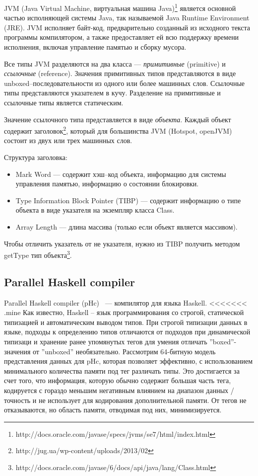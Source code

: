 JVM (Java Virtual Machine, виртуальная машина Java)\footnote{http://docs.oracle.com/javase/specs/jvms/se7/html/index.html}
является основной частью исполняющей системы Java, так называемой Java Runtime Environment (JRE).
JVM исполняет байт-код, предварительно созданный из исходного текста программы компилятором, а также
предоставляет ей всю поддержку времени исполнения, включая управление памятью и сборку мусора.

Все типы JVM разделяются на два класса --- \emph{примитивные} (primitive) и \emph{ссылочные} (reference).
Значения примитивных типов представляются в виде unboxed--последовательности из одного или более машинных слов.
Ссылочные типы представляются указателем в кучу. Разделение на примитивные и ссылочные типы является статическим.

Значение ссылочного типа представляется в виде \emph{объекта}.
Каждый объект содержит заголовок\footnote{http://jug.ua/wp-content/uploads/2013/02}, который для 
большинства JVM (Hotspot, openJVM) состоит из двух или трех машинных слов.

Структура заголовка:

\begin{itemize}
\item Mark Word --- содержит хэш--код объекта, информацию для системы управления памятью, информацию о состоянии блокировки. 
\item Type Information Block Pointer (TIBP) --- содержит информацию о типе объекта в виде указателя на экземпляр класса Class.
\item Array Length --- длина массива (только если объект является массивом).
\end{itemize}            

Чтобы отличить указатель от не указателя, нужно из TIBP получить методом getType тип объекта\footnote{http://docs.oracle.com/javase/6/docs/api/java/lang/Class.html}.

\subsection {Parallel Haskell compiler}

Parallel Haskell compiler (pHc)~\cite{pHc} — компилятор для языка Haskell.
<<<<<<< .mine
Как известно, Haskell -- язык программирования со строгой, статической типизацией и автоматическим выводом типов.
При строгой типизации данных в языке, подходы к определению типов отличаются от подходов при динамической типизаци и хранение ранее упомянутых тегов для умения отличать ''boxed''-значения от ''unboxed'' необязательно.
Рассмотрим 64-битную модель представления данных для pHc, которая позволяет эффективно, с использованием минимального количества памяти под тег различать типы.
Это достигается за счет того, что информация, которую обычно содержит большая часть тега, кодируется с гораздо меньшим негативным влиянием на диапазон данных / точность и не использует для кодирования дополнительной памяти.
От тегов не отказываются, но область памяти, отводимая под них, минимизируется.

